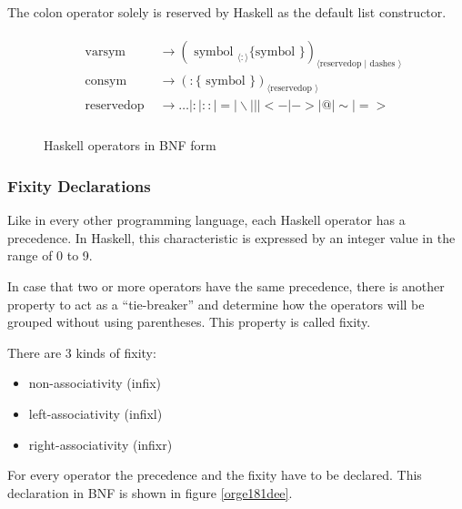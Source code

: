 \documentclass[a4paper, titlepage, twoside]{article}
\begin{document}
The colon operator solely is reserved by Haskell as the default list constructor.

\begin{figure}
\begin{displaymath}
\begin{aligned}
&\begin{array}{ll}
\text { varsym } & \rightarrow \left(\text { symbol }_{\langle:\rangle}\{\text {symbol }\}\right)_{\langle\text {reservedop }| \text { dashes }\rangle} \\
\text { consym } & \rightarrow(:\{\text { symbol }\})_{\langle\text {reservedop }\rangle} \\
\text { reservedop } & \rightarrow \ldots|:|::|=| \backslash|||<-|->|@| \sim \mid=> \\
\end{array}
\end{aligned}
\end{displaymath}
\caption{\label{org0c3e115}Haskell operators in BNF form}
\end{figure}

\subsubsection{Fixity Declarations}
\label{sec:org9c5d866}

Like in every other programming language, each Haskell operator has a precedence. In Haskell, this characteristic is expressed by an integer value in the range of 0 to 9.

In case that two or more operators have the same precedence, there is another property to act as a ``tie-breaker'' and determine how the operators will be grouped without using parentheses. This property is called fixity.

There are 3 kinds of fixity:

\begin{itemize}
\item non-associativity (infix)
\item left-associativity (infixl)
\item right-associativity (infixr)
\end{itemize}

For every operator the precedence and the fixity have to be declared. This declaration in BNF is shown in figure \ref{orge181dee}.
\end{document}
